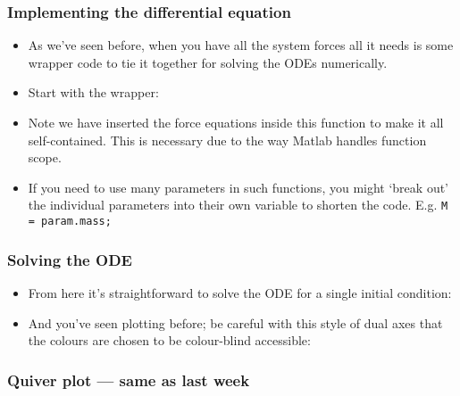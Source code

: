 \documentclass[9pt]{beamer-control}
\begin{document}
\begin{frame}
\frametitle{Implementing the differential equation}

\begin{itemize}
\item As we've seen before, when you have all the system forces all it needs is some wrapper code to tie it together for solving the ODEs numerically.
\item Start with the wrapper:
\end{itemize}


\begin{itemize}
\item Note we have inserted the force equations inside this function to make it all self-contained. This is necessary due to the way Matlab handles function scope.
\item If you need to use many parameters in such functions, you might `break out' the individual parameters into their own variable to shorten the code. E.g. \texttt{M = param.mass;}
\end{itemize}

\end{frame}

\begin{frame}
\frametitle{Solving the ODE}

\begin{itemize}
\item From here it's straightforward to solve the ODE for a single initial condition:
\end{itemize}


\begin{itemize}
\item And you've seen plotting before; be careful with this style of dual axes that the colours are chosen to be colour-blind accessible:
\end{itemize}


\end{frame}


\begin{frame}
\frametitle{Quiver plot --- same as last week}



\end{frame}
\end{document}
